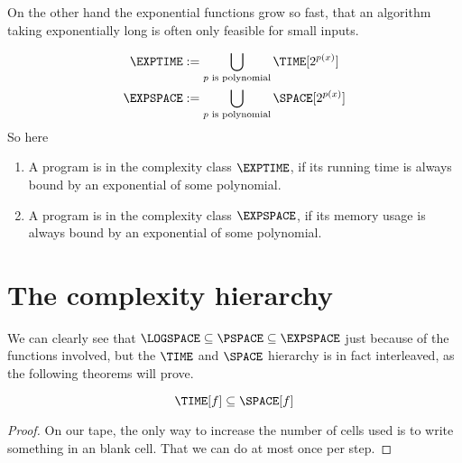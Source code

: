 On the other hand the exponential functions grow so fast, that an algorithm 
taking exponentially long is often only feasible for small inputs.

\begin{defn}
	\begin{equation*}
		\begin{split}
			\EXPTIME &:= \bigcup_{p\text{ is polynomial}} \TIME[2^{p(x)}]\\
			\EXPSPACE &:= \bigcup_{p\text{ is polynomial}} \SPACE[2^{p(x)}]\\
		\end{split}
	\end{equation*}
	So here
	\begin{enumerate}
		\item A program is in the complexity class $\EXPTIME$, if its running time is always bound 
			by an exponential of some polynomial.
		\item A program is in the complexity class $\EXPSPACE$, if its memory usage is always bound 
		by an exponential of some polynomial.
	\end{enumerate}
\end{defn}

\section{The complexity hierarchy}
We can clearly see that $\LOGSPACE\subseteq \PSPACE\subseteq\EXPSPACE$ just because of 
the functions involved, but the $\TIME$ and $\SPACE$ 
hierarchy is in fact interleaved, as the following theorems will prove.
\begin{theorem}
	\[\TIME[f] \subseteq \SPACE[f]\]
\end{theorem}
\begin{proof}
	On our tape, the only way to increase the number of cells used is to write 
	something in an blank cell. That we can do at most once per step.
\end{proof}


